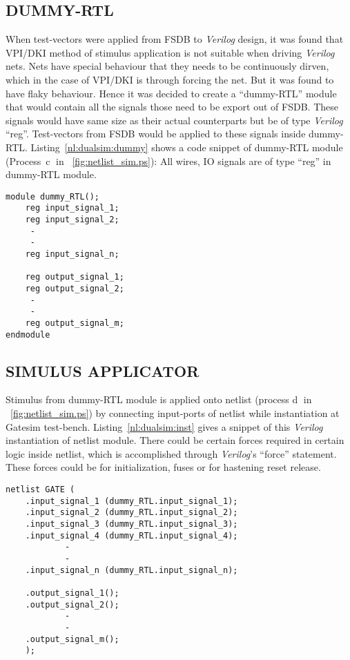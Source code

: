\subsection{DUMMY-RTL}
When test-vectors were applied from FSDB to {\it Verilog} design, it was found that VPI/DKI method of stimulus application is not suitable when driving {\it Verilog} nets. Nets have special behaviour that they needs to be continuously dirven, which in the case of VPI/DKI is through forcing the net. But it was found to have flaky behaviour. Hence it was decided to create a ``dummy-RTL'' module that would contain all the signals those need to be export out of FSDB. These signals would have same size as their actual counterparts but be of type {\it Verilog} ``reg''. Test-vectors from FSDB would be applied to these signals inside dummy-RTL. Listing~\ref{nl:dualsim:dummy} shows a code snippet of dummy-RTL module (Process~\textcircled{c} in \figurename~{\ref{fig:netlist_sim.ps}}): All wires, IO signals are of type ``reg'' in dummy-RTL module.

\lstset{language=Verilog,
basicstyle=\footnotesize,
frame=shadowbox,
breaklines=true}          
\begin{lstlisting}[frame=single, caption=Dummy RTL Module, label=nl:dualsim:dummy]  
module dummy_RTL();
	reg input_signal_1;
	reg input_signal_2;
	 -
	 -
	reg input_signal_n;
					
	reg output_signal_1;
	reg output_signal_2;
	 -
	 -
	reg output_signal_m;
endmodule
\end{lstlisting}



\subsection{SIMULUS APPLICATOR}
Stimulus from dummy-RTL module is applied onto netlist (process \textcircled{d} in \figurename~{\ref{fig:netlist_sim.ps}}) by connecting input-ports of netlist while instantiation at Gatesim test-bench.  Listing~\ref{nl:dualsim:inst} gives a snippet of this {\it Verilog} instantiation of netlist module. There could be certain forces required in certain logic inside netlist, which is accomplished through {\it Verilog}'s ``force'' statement. These forces could be for initialization, fuses or for hastening reset release.

\lstset{language=Verilog,
basicstyle=\footnotesize,
frame=shadowbox,
breaklines=true}          
\begin{lstlisting}[frame=single, caption=Verilog Instantiation, label=nl:dualsim:inst]  
netlist GATE (
	.input_signal_1 (dummy_RTL.input_signal_1);
	.input_signal_2 (dummy_RTL.input_signal_2);
	.input_signal_3 (dummy_RTL.input_signal_3);
	.input_signal_4 (dummy_RTL.input_signal_4);
			-
			-
	.input_signal_n (dummy_RTL.input_signal_n);

	.output_signal_1();
	.output_signal_2();
			-
			-
	.output_signal_m();
	);

\end{lstlisting}



